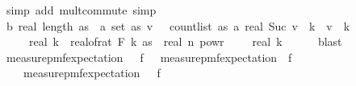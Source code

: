 \begin{isabellebody}
\ {\isacharparenleft}{\kern0pt}simp\ add{\isacharcolon}{\kern0pt}\ mult{\isachardot}{\kern0pt}commute{\isacharcomma}{\kern0pt}\ simp{\isacharparenright}{\kern0pt}\isanewline
\ \ \isamarkupfalse%
\ \isamarkupfalse%
\ b{\isacharcolon}{\kern0pt}\ {\isachardoublequoteopen}real\ {\isacharparenleft}{\kern0pt}length\ as{\isacharparenright}{\kern0pt}\ {\isacharasterisk}{\kern0pt}\ {\isacharparenleft}{\kern0pt}{\isasymSum}a{\isasymin}\ set\ as{\isachardot}{\kern0pt}\ {\isacharparenleft}{\kern0pt}{\isasymSum}v\ {\isasymin}\ {\isacharbraceleft}{\kern0pt}{}{\isachardot}{\kern0pt}{\isachardot}{\kern0pt}{\isacharless}{\kern0pt}\ count{\isacharunderscore}{\kern0pt}list\ as\ a{\isacharbraceright}{\kern0pt}{\isachardot}{\kern0pt}\ {\isacharparenleft}{\kern0pt}real\ {\isacharparenleft}{\kern0pt}Suc\ v\ {\isacharcircum}{\kern0pt}\ k\ {\isacharminus}{\kern0pt}\ v\ {\isacharcircum}{\kern0pt}\ k{\isacharparenright}{\kern0pt}{\isacharparenright}{\kern0pt}\isanewline
\ \ \ \ {\isasymle}\ real\ k\ {\isacharasterisk}{\kern0pt}\ {\isacharparenleft}{\kern0pt}{\isacharparenleft}{\kern0pt}real{\isacharunderscore}{\kern0pt}of{\isacharunderscore}{\kern0pt}rat\ {\isacharparenleft}{\kern0pt}F\ k\ as{\isacharparenright}{\kern0pt}{\isacharparenright}{\kern0pt}\ {\isacharasterisk}{\kern0pt}\ real\ n\ powr\ {\isacharparenleft}{\kern0pt}{}\ {\isacharminus}{\kern0pt}\ {}\ {\isacharslash}{\kern0pt}\ real\ k{\isacharparenright}{\kern0pt}{\isacharparenright}{\kern0pt}{\isachardoublequoteclose}\isanewline
\ \ \ \ \isamarkupfalse%
\ blast\isanewline
\isanewline
\ \ \isamarkupfalse%
\ {\isachardoublequoteopen}measure{\isacharunderscore}{\kern0pt}pmf{\isachardot}{\kern0pt}expectation\ {\isasymOmega}\ {\isacharparenleft}{\kern0pt}{\isasymlambda}{\isasymomega}{\isachardot}{\kern0pt}\ f\ {\isasymomega}{\isacharcircum}{\kern0pt}{}{\isacharparenright}{\kern0pt}\ {\isacharminus}{\kern0pt}\ {\isacharparenleft}{\kern0pt}measure{\isacharunderscore}{\kern0pt}pmf{\isachardot}{\kern0pt}expectation\ {\isasymOmega}\ f{\isacharparenright}{\kern0pt}{\isacharcircum}{\kern0pt}{}\ {\isasymle}\ \isanewline
\ \ \ \ measure{\isacharunderscore}{\kern0pt}pmf{\isachardot}{\kern0pt}expectation\ {\isasymOmega}\ {\isacharparenleft}{\kern0pt}{\isasymlambda}{\isasymomega}{\isachardot}{\kern0pt}\ f\ {\isasymomega}{\isacharcircum}{\kern0pt}{}{\isacharparenright}{\kern0pt}{\isachardoublequoteclose}\ \isanewline

\end{isabellebody}
